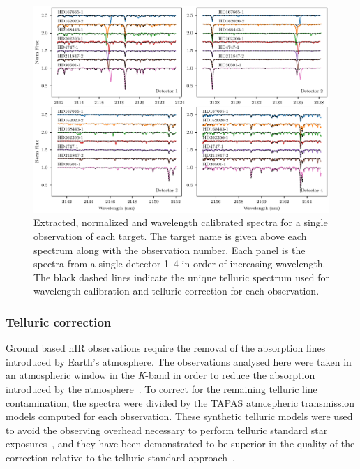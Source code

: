 \documentclass[fleqn,usenatbib]{mnras}
\begin{document}
    \begin{figure}
        \includegraphics[width=0.8\hsize]{images/fig2.pdf}
        \caption{Extracted, normalized and wavelength calibrated spectra for a single observation of each target. The target name is given above each spectrum along with the observation number. Each panel is the spectra from a single detector 1--4 in order of increasing wavelength. The black dashed lines indicate the unique telluric spectrum used for wavelength calibration and telluric correction for each observation.}
        \label{fig:detector4allspectra}
    \end{figure}
    
    \subsubsection{Telluric correction}
    \label{subsec:telluric_correction}
    Ground based nIR observations require the removal of the absorption lines introduced by Earth's atmosphere. The observations analysed here were taken in an atmospheric window in the \textit{K}-band in order to reduce the absorption introduced by the atmosphere~\citep{barnes_hd_2008}. To correct for the remaining telluric line contamination, the spectra were divided by the TAPAS\citep{bertaux_tapas_2014} atmospheric transmission models computed for each observation. These synthetic telluric models were used to avoid the observing overhead necessary to perform telluric standard star exposures~\citep{vacca_method_2003}, and they have been demonstrated to be superior in the quality of the correction relative to the telluric standard approach~\citep[e.g.][]{cotton_atmospheric_2014}.
    
\end{document}
